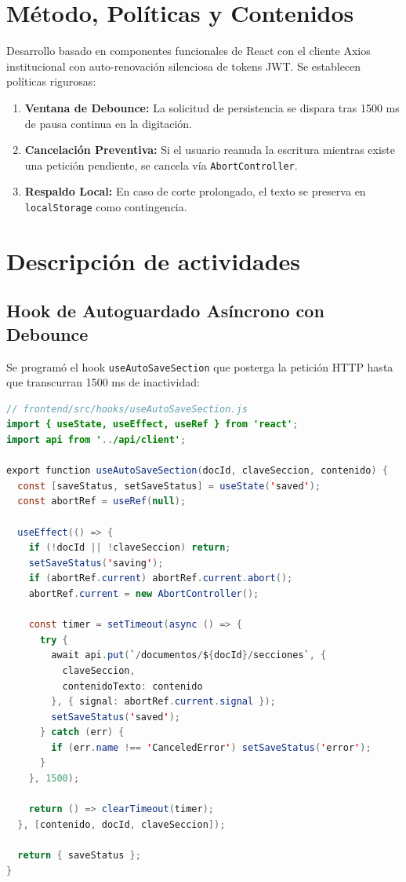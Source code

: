 \documentclass[12pt,a4paper]{article}
\begin{document}
\section{Método, Políticas y Contenidos}
Desarrollo basado en componentes funcionales de React con el cliente Axios institucional con auto-renovación silenciosa de tokens JWT. Se establecen políticas rigurosas:
\begin{enumerate}[leftmargin=1.5em, itemsep=1.5pt]
    \item \textbf{Ventana de Debounce:} La solicitud de persistencia se dispara tras 1500 ms de pausa continua en la digitación.
    \item \textbf{Cancelación Preventiva:} Si el usuario reanuda la escritura mientras existe una petición pendiente, se cancela vía \texttt{AbortController}.
    \item \textbf{Respaldo Local:} En caso de corte prolongado, el texto se preserva en \texttt{localStorage} como contingencia.
\end{enumerate}

\section{Descripción de actividades}

\subsection{Hook de Autoguardado Asíncrono con Debounce}
Se programó el hook \texttt{useAutoSaveSection} que posterga la petición HTTP hasta que transcurran 1500 ms de inactividad:

\begin{lstlisting}[language=Java]
// frontend/src/hooks/useAutoSaveSection.js
import { useState, useEffect, useRef } from 'react';
import api from '../api/client';

export function useAutoSaveSection(docId, claveSeccion, contenido) {
  const [saveStatus, setSaveStatus] = useState('saved');
  const abortRef = useRef(null);

  useEffect(() => {
    if (!docId || !claveSeccion) return;
    setSaveStatus('saving');
    if (abortRef.current) abortRef.current.abort();
    abortRef.current = new AbortController();

    const timer = setTimeout(async () => {
      try {
        await api.put(`/documentos/${docId}/secciones`, {
          claveSeccion,
          contenidoTexto: contenido
        }, { signal: abortRef.current.signal });
        setSaveStatus('saved');
      } catch (err) {
        if (err.name !== 'CanceledError') setSaveStatus('error');
      }
    }, 1500);

    return () => clearTimeout(timer);
  }, [contenido, docId, claveSeccion]);

  return { saveStatus };
}
\end{lstlisting}
\end{document}
